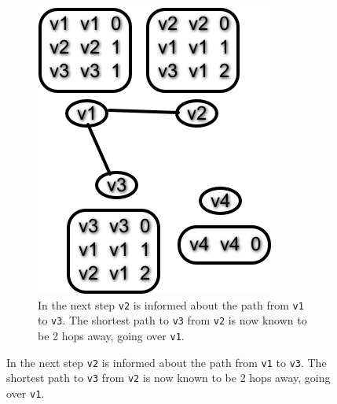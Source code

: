 \begin{figure}
\begin{subfigure}{.45\textwidth}
        \includegraphics[width=\textwidth] {images/dv3.png}
        \caption{In the next step \texttt{v2} is informed about the path from \texttt{v1} to \texttt{v3}.
                 The shortest path to \texttt{v3} from \texttt{v2} is now known to be 2 hops away, going over \texttt{v1}.}
    \end{subfigure}
\end{figure}
\clearpage
